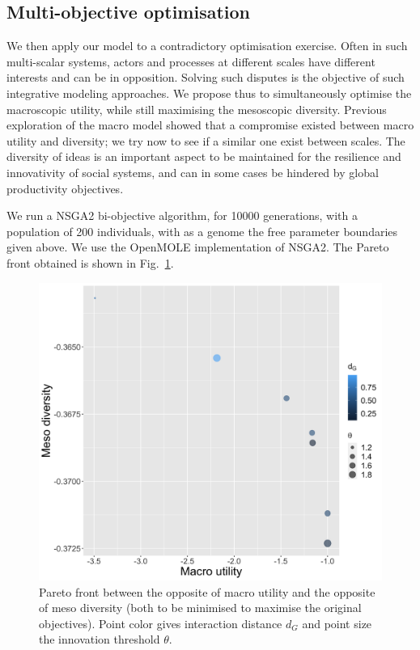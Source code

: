 \documentclass[letterpaper]{article}
\begin{document}
\subsection{Multi-objective optimisation}


We then apply our model to a contradictory optimisation exercise. Often in such multi-scalar systems, actors and processes at different scales have different interests and can be in opposition. Solving such disputes is the objective of such integrative modeling approaches. We propose thus to simultaneously optimise the macroscopic utility, while still maximising the mesoscopic diversity. Previous exploration of the macro model showed that a compromise existed between macro utility and diversity; we try now to see if a similar one exist between scales. The diversity of ideas is an important aspect to be maintained for the resilience and innovativity of social systems, and can in some cases be hindered by global productivity objectives.

We run a NSGA2 bi-objective algorithm, for 10000 generations, with a population of 200 individuals, with as a genome the free parameter boundaries given above. We use the OpenMOLE implementation of NSGA2. The Pareto front obtained is shown in Fig.~\ref{fig:pareto}.

\begin{figure}[h!]
    \centering
    \includegraphics[width=\linewidth]{figures/paretoDiversity-Fitness_colordG_sizetheta}
    \caption{Pareto front between the opposite of macro utility and the opposite of meso diversity (both to be minimised to maximise the original objectives). Point color gives interaction distance $d_G$ and point size the innovation threshold $\theta$.\label{fig:pareto}}
\end{figure}
\end{document}
